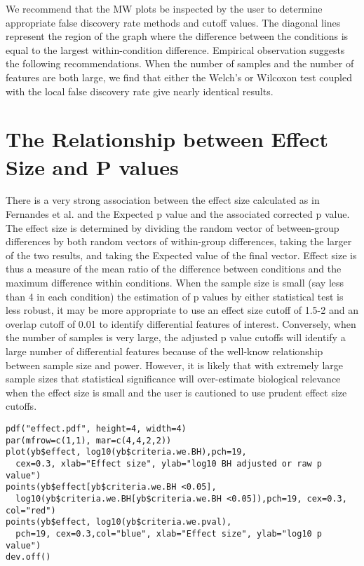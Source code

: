 \documentclass[11pt]{article}
\begin{document}
We recommend that the MW plots  be inspected by the user to determine appropriate false discovery rate methods and cutoff values. The diagonal lines represent the region of the graph where the difference between the conditions is equal to the largest within-condition difference\cite{fernandes:2013}. Empirical observation suggests the following recommendations. When the number of samples and the number of features are both large, we find that either the Welch's or Wilcoxon test coupled with the local false discovery rate give nearly identical results. 

\section{The Relationship between Effect Size and P values} There is a very strong association between the effect size calculated as in Fernandes et al.\cite{fernandes:2013} and the Expected p value and the associated corrected p value. The effect size is determined by dividing the random vector of between-group differences by both random vectors of within-group differences, taking the larger of the two results, and taking the Expected value of the final vector. Effect size is thus a measure of the mean ratio of the difference between conditions and the maximum difference within conditions. When the sample size is small (say less than 4 in each condition)  the estimation of p values by either statistical test is less robust, it may be more appropriate to use an effect size cutoff of 1.5-2 and an overlap cutoff of 0.01 to identify differential features of interest\cite{fernandes:2013}. Conversely, when the number of samples is very large, the adjusted p value cutoffs will identify a large number of differential features because of the well-know relationship between sample size and power. However, it is likely that with extremely large sample sizes that statistical significance will over-estimate biological relevance when the effect size is small and the user is cautioned to use prudent effect size cutoffs\cite{Nakagawa:2007}.\
\begin{verbatim}pdf("effect.pdf", height=4, width=4)
par(mfrow=c(1,1), mar=c(4,4,2,2))
plot(yb$effect, log10(yb$criteria.we.BH),pch=19, 
  cex=0.3, xlab="Effect size", ylab="log10 BH adjusted or raw p value")
points(yb$effect[yb$criteria.we.BH <0.05], 
  log10(yb$criteria.we.BH[yb$criteria.we.BH <0.05]),pch=19, cex=0.3, col="red")
points(yb$effect, log10(yb$criteria.we.pval), 
  pch=19, cex=0.3,col="blue", xlab="Effect size", ylab="log10 p value")
dev.off()
\end{verbatim}
\end{document}
